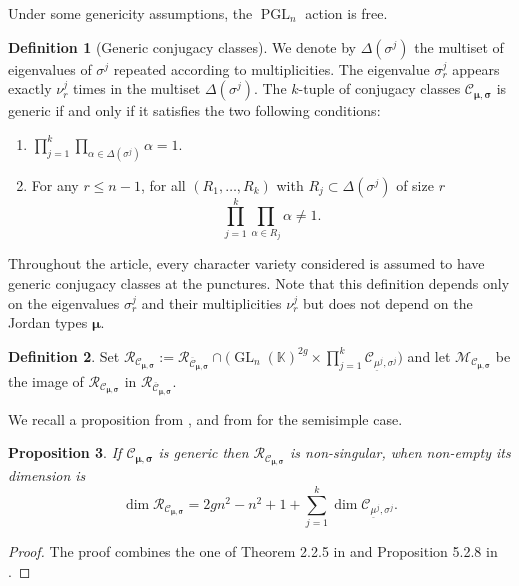 \documentclass[JEP,XML,SOM,NoEqCountersInSection,Unicode,published]{cedram}
\theoremstyle{definition}
\newtheorem{definition}{Definition}[section]
\theoremstyle{plain}
\newtheorem{proposition}[definition]{Proposition}
\DeclareMathOperator{\GL}{GL}
\DeclareMathOperator{\PGL}{PGL}
\newcommand\KK{\mathbb K }
\begin{document}
Under some genericity assumptions, the $\PGL_n$ action is free.
\begin{definition}[Generic conjugacy classes]\label{def_generic_class}
We denote by $\Delta(\sigma^j)$ the multiset of eigenvalues of $\sigma^j$ repeated according to multiplicities. The eigenvalue $\sigma^j_r$ appears exactly $\nu^j_r$ times in the multiset $\Delta(\sigma^j)$. The $k$-tuple of conjugacy classes $\mathcal{C}_{\boldsymbol{\mu},\boldsymbol{\sigma}}$ is generic if and only if it satisfies the two following conditions:
\begin{enumerate}
\item\enspace
$\displaystyle\prod_{j=1}^k\prod_{\alpha \in \Delta (\sigma^j)}\alpha = 1$.
\item For any $r \le n-1$, for all $(R_1,\dots, R_k)$ with $R_j\subset \Delta(\sigma^j)$ of size $r$
\[
\prod_{j=1}^k \prod_{\alpha\in R_j} \alpha \ne 1.
\]
\end{enumerate}
Throughout the article, every character variety considered is assumed to have generic conjugacy classes at the punctures. Note that this definition depends only on the eigenvalues $\sigma^j_r$ and their multiplicities $\nu_r^j$ but does not depend on the Jordan types $\boldsymbol{\mu}$.
\end{definition}

\begin{definition}
Set $\mathcal{R}_{\mathcal{C}_{\boldsymbol{\mu},\boldsymbol{\sigma}}}:=\mathcal{R}_{\overline{\mathcal{C}}_{\boldsymbol{\mu},\boldsymbol{\sigma}}} \cap\bigl(\GL_n(\KK)^{2 g}\times \prod_{j=1}^k \mathcal{C}_{\underline{\mu}^j,\sigma^j}\bigr)$ and let $\mathcal{M}_{\mathcal{C}_{\boldsymbol{\mu},\boldsymbol{\sigma}}} $ be the image of $\mathcal{R}_{\mathcal{C}_{\boldsymbol{\mu},\boldsymbol{\sigma}}}$ in $\mathcal{R}_{\overline{\mathcal{C}}_{\boldsymbol{\mu},\boldsymbol{\sigma}}}$.
\end{definition}

We recall a proposition from \cite{Letellier13}, and from \cite{Hausel_Letellier_Villegas} for the semisimple case.

\begin{proposition}\label{prop_smooth}
If $\mathcal{C}_{\boldsymbol{\mu},\boldsymbol{\sigma}}$ is generic then $\mathcal{R}_{\mathcal{C}_{\boldsymbol{\mu},\boldsymbol{\sigma}}}$ is non-singular, when non-empty its dimension is
\[
\dim \mathcal{R}_{\mathcal{C}_{\boldsymbol{\mu},\boldsymbol{\sigma}}} = 2 g n^2 -n^2 +1 +\sum_{j=1}^k \dim \mathcal{C}_{\underline{\mu}^j,\sigma^j}.
\]
\end{proposition}
\begin{proof}
The proof combines the one of Theorem 2.2.5 in \cite{Hausel_Villegas} and Proposition 5.2.8 in \cite{Etingof_Oblomkov_Rains}.
\end{proof}
\end{document}
